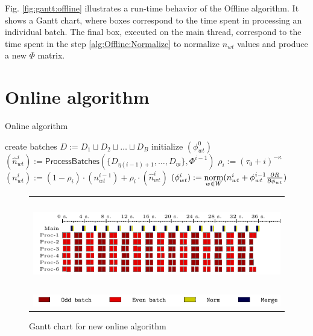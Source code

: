 \documentclass[russian,english]{llncs}
\newcommand{\norm}{\mathop{\rm norm}\limits}
\newcommand{\kw}[1]{\textsf{#1}}
\begin{document}
Fig. \ref{fig:gantt:offline} illustrates a run-time behavior of the \kw{Offline algorithm}.
It shows a Gantt chart, where boxes correspond to the time spent in processing an individual batch.
The final box, executed on the main thread, correspond to the time spent in the step \ref{alg:Offline:Normalize}
to normalize $n_{wt}$ values and produce a new $\Phi$ matrix.

\section{Online algorithm}
\label{sec:Online}

\SetAlgoSkip{}
\begin{algorithm2e}[t]
	\caption{Online algorithm} %
	\label{alg:Online}
	\BlankLine
	\BlankLine
	create batches $D := D_1 \sqcup D_2 \sqcup \dots \sqcup D_B$\;
	initialize $(\phi^0_{wt})$\;
	 {
		$(\hat n^i_{wt}) := \kw{ProcessBatches}(\{D_{\eta (i - 1) + 1}, \dots, D_{\eta i}\}, \Phi^{i - 1})$\;
		$\rho_i := (\tau_0 + i)^{-\kappa}$\;
		\label{alg:Online:Rho}
		$(n^{i}_{wt}) := (1 - \rho_i) \cdot (n^{i-1}_{wt}) + \rho_i \cdot (\hat n^{i}_{wt})$\;
		\label{alg:Online:Merge}
		$(\phi^{i}_{wt}) := \norm_{w \in W} (n^{i}_{wt} + \phi^{i - 1}_{wt} \frac{\partial R}{\partial \phi_{wt}})$\;
		\label{alg:Online:Normalize}
	}
\end{algorithm2e}
\begin{figure}[t!]
	\centering
	\begin{tabular}{c}
		\includegraphics[height=4cm, width=12cm]{plots/online.pdf} \\
		\includegraphics[scale=1]{plots/legend_online.pdf}
	\end{tabular}
	\caption{Gantt chart for new online algorithm} \label{fig:gantt:online}
\end{figure}
\end{document}
